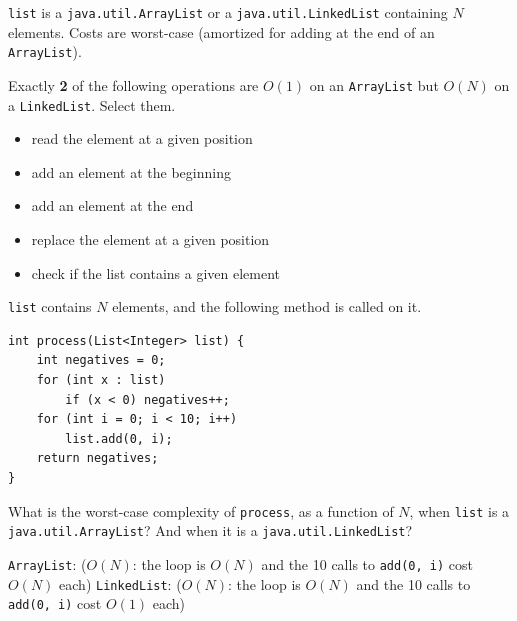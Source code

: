 \begin{question}
\lstinline|list| is a \lstinline|java.util.ArrayList| or a \lstinline|java.util.LinkedList| containing $N$ elements.
Costs are worst-case (amortized for adding at the end of an \lstinline|ArrayList|).

Exactly \textbf{2} of the following operations are $O(1)$ on an \lstinline|ArrayList| but $O(N)$ on a \lstinline|LinkedList|. Select them.
\begin{itemize}[leftmargin=2em,itemsep=1pt,topsep=2pt]
\item[\cb{1}] read the element at a given position
\item[\cb{0}] add an element at the beginning
\item[\cb{0}] add an element at the end
\item[\cb{1}] replace the element at a given position
\item[\cb{0}] check if the list contains a given element
\end{itemize}
\end{question}

\begin{question}
\lstinline|list| contains $N$ elements, and the following method is called on it.

\begin{lstlisting}
int process(List<Integer> list) {
    int negatives = 0;
    for (int x : list)
        if (x < 0) negatives++;
    for (int i = 0; i < 10; i++)
        list.add(0, i);
    return negatives;
}
\end{lstlisting}

What is the worst-case complexity of \lstinline|process|, as a function of $N$, when \lstinline|list| is a \lstinline|java.util.ArrayList|? And when it is a \lstinline|java.util.LinkedList|?

\lstinline|ArrayList|: \underline{\hspace{1in}} \ifanswers ($O(N)$: the loop is $O(N)$ and the 10 calls to \lstinline|add(0, i)| cost $O(N)$ each)\fi \qquad
\lstinline|LinkedList|: \underline{\hspace{1in}} \ifanswers ($O(N)$: the loop is $O(N)$ and the 10 calls to \lstinline|add(0, i)| cost $O(1)$ each)\fi
\end{question}

